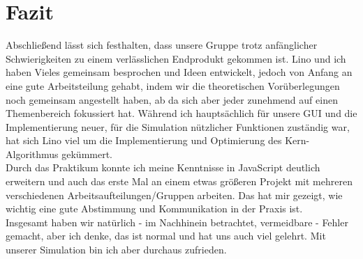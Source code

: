 \section{Fazit}
Abschließend lässt sich festhalten, dass unsere Gruppe trotz anfänglicher Schwierigkeiten zu einem verlässlichen Endprodukt gekommen ist. Lino und ich haben Vieles gemeinsam besprochen und Ideen entwickelt, jedoch von Anfang an eine gute Arbeitsteilung gehabt, indem wir die theoretischen Vorüberlegungen noch gemeinsam angestellt haben, ab da sich aber jeder zunehmend auf einen Themenbereich fokussiert hat. Während ich hauptsächlich für unsere GUI und die Implementierung neuer, für die Simulation nützlicher Funktionen zuständig war, hat sich Lino viel um die Implementierung und Optimierung des \glqq{}Kern-Algorithmus\grqq{} gekümmert. \\
Durch das Praktikum konnte ich meine Kenntnisse in JavaScript deutlich erweitern und auch das erste Mal an einem etwas größeren Projekt mit mehreren verschiedenen Arbeitsaufteilungen/Gruppen arbeiten. Das hat mir gezeigt, wie wichtig eine gute Abstimmung und Kommunikation in der Praxis ist. \\
Insgesamt haben wir natürlich - im Nachhinein betrachtet, vermeidbare - Fehler gemacht, aber ich denke, das ist normal und hat uns auch viel gelehrt. Mit unserer Simulation bin ich aber durchaus zufrieden.